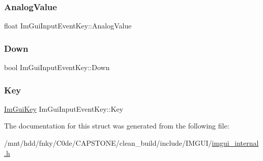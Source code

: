 \subsubsection{\texorpdfstring{Analog\+Value}{AnalogValue}}
{\footnotesize\ttfamily float Im\+Gui\+Input\+Event\+Key\+::\+Analog\+Value}

\mbox{\label{structImGuiInputEventKey_a44a873572239dde28b0e332b6e8582bf}} 
\subsubsection{\texorpdfstring{Down}{Down}}
{\footnotesize\ttfamily bool Im\+Gui\+Input\+Event\+Key\+::\+Down}

\mbox{\label{structImGuiInputEventKey_aa4efa74612b817e41b2a73f2f0d41b1c}} 
\subsubsection{\texorpdfstring{Key}{Key}}
{\footnotesize\ttfamily \hyperlink{imgui_8h_aa22ffe36b188427d712447ec465203d4}{Im\+Gui\+Key} Im\+Gui\+Input\+Event\+Key\+::\+Key}



The documentation for this struct was generated from the following file\+:\begin{DoxyCompactItemize}
\item 
/mnt/hdd/fnky/\+C0de/\+C\+A\+P\+S\+T\+O\+N\+E/clean\+\_\+build/include/\+I\+M\+G\+U\+I/\hyperlink{imgui__internal_8h}{imgui\+\_\+internal.\+h}\end{DoxyCompactItemize}
